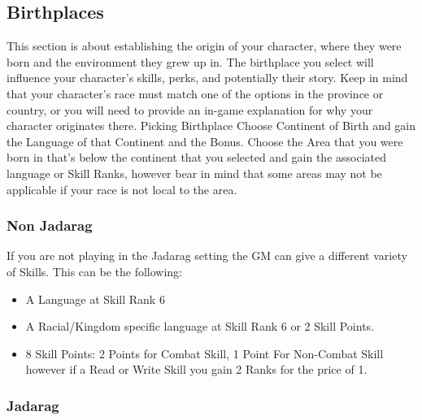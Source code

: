 \subsection{Birthplaces}
This section is about establishing the origin of your character, where they were born and the environment they grew up in. The birthplace you select will influence your character's skills, perks, and potentially their story. Keep in mind that your character's race must match one of the options in the province or country, or you will need to provide an in-game explanation for why your character originates there.
Picking Birthplace
Choose Continent of Birth and gain the Language of that Continent and the Bonus.
Choose the Area that you were born in that's below the continent that you selected and gain the associated language or Skill Ranks, however bear in mind that some areas may not be applicable if your race is not local to the area.
\subsubsection{Non Jadarag}
If you are not playing in the Jadarag setting the GM can give a different variety of Skills. This can be the following:
\begin{itemize}
\item A Language at Skill Rank 6
\item A Racial/Kingdom specific language at Skill Rank 6 or 2 Skill Points.
\item 8 Skill Points: 2 Points for Combat Skill, 1 Point For Non-Combat Skill however if a Read or Write Skill you gain 2 Ranks for the price of 1.
\end{itemize}
\subsubsection{Jadarag}

